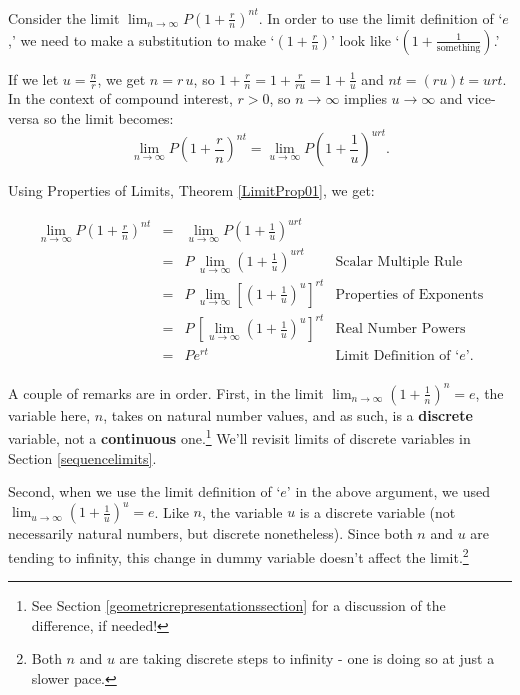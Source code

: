 \documentclass{ximera}
\begin{document}
 Consider the limit $\lim_{n \rightarrow \infty} P\left(1 + \frac{r}{n}\right)^{nt}$.   In order to use the limit definition of `$e$,' we need to make a substitution to make `$\left(1 + \frac{r}{n}\right)$' look like `$\left(1 + \frac{1}{\text{something}}\right)$.'  
 
 
If we let $u = \frac{n}{r}$, we get $n = r \, u$, so  $1 + \frac{r}{n} = 1 + \frac{r}{ru} = 1 + \frac{1}{u}$ and $nt = (ru)t  = urt$.  In the context of compound interest, $r > 0$, so $n \rightarrow \infty$ implies $u \rightarrow \infty$ and vice-versa so the limit becomes: 
\[ \lim_{n \rightarrow \infty} P\left(1 + \frac{r}{n}\right)^{nt} =  \lim_{u \rightarrow \infty} P\left(1 + \frac{1}{u}\right)^{urt}.\]

 

Using Properties of Limits, Theorem \ref{LimitProp01}, we get:

\[ \begin{array}{rclr} 
\lim_{n \rightarrow \infty} P\left(1 + \frac{r}{n}\right)^{nt} & = &  \lim_{u \rightarrow \infty} P\left(1 + \frac{1}{u}\right)^{urt} & \\
& = & P \, \lim_{u \rightarrow \infty} \left(1 + \frac{1}{u}\right)^{urt} & \text{Scalar Multiple Rule} \\
& = & P \, \lim_{u \rightarrow \infty} \left[\left(1 + \frac{1}{u}\right)^{u}\right]^{rt} & \text{Properties of Exponents}\\
& = & P \, \left[  \lim_{u \rightarrow \infty} \left(1 + \frac{1}{u}\right)^{u} \right]^{rt} & \text{Real Number Powers}\\
& = & Pe^{rt} & \text{Limit Definition of `$e$'.}\\ \end{array}\]
                                                                            
A couple of remarks are in order.  First, in the limit $\lim_{n \rightarrow \infty} \left(1+\frac{1}{n}\right)^{n} = e$, the variable here, $n$, takes on natural number values, and as such, is a \textbf{discrete} variable, not a \textbf{continuous} one.\footnote{See Section \ref{geometricrepresentationssection} for a discussion of the difference, if needed!}  We'll revisit limits of discrete variables in Section \ref{sequencelimits}.  

Second, when we use the limit definition of `$e$' in the above argument, we used  $\lim_{u \rightarrow \infty} \left(1+\frac{1}{u}\right)^{u} = e$.  Like $n$, the variable $u$ is a discrete variable (not necessarily natural numbers, but discrete nonetheless).  Since both $n$ and $u$ are tending to infinity, this change in  dummy variable doesn't affect the limit.\footnote{Both $n$ and $u$ are taking discrete steps to infinity - one is doing so at just a slower pace.}
\end{document}
